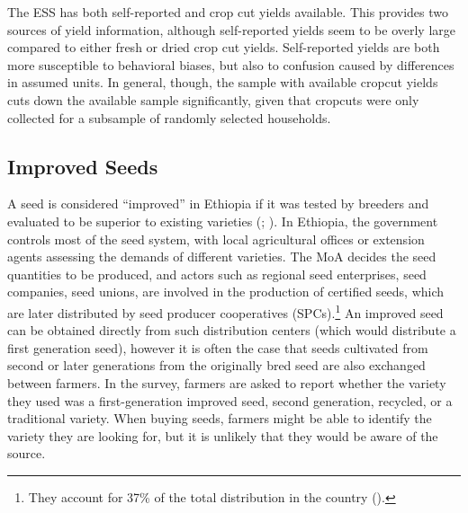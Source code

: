 \documentclass[11pt]{article}
\begin{document}

The ESS has both self-reported and crop cut yields available. This provides two sources of yield information, although self-reported yields seem to be overly large compared to either fresh or dried crop cut yields. Self-reported yields are both more susceptible to behavioral biases, but also to confusion caused by differences in assumed units. In general, though, the sample with available cropcut yields cuts down the available sample significantly, given that cropcuts were only collected for a subsample of randomly selected households.


\subsection{Improved Seeds}

A seed is considered “improved” in Ethiopia if it was tested by breeders and evaluated to be superior to existing varieties  (\citealp{MoA13}; \citealp{kosmowski2020shining}). In Ethiopia, the government controls most of the seed system, with local agricultural offices or extension agents assessing the demands of different varieties. The MoA decides the seed quantities to be produced, and actors such as regional seed enterprises, seed companies, seed unions, are involved in the production of certified seeds, which are later distributed by seed producer cooperatives (SPCs).\footnote{They account for 37\% of the total distribution in the country (\citealp{kosmowski2020shining}).} An improved seed can be obtained directly from such distribution centers (which would distribute a first generation seed), however it is often the case that seeds cultivated from second or later generations from the originally bred seed are also exchanged between farmers. In the survey, farmers are asked to report whether the variety they used was a first-generation improved seed, second generation, recycled, or a traditional variety. When buying seeds, farmers might be able to identify the variety they are looking for, but it is unlikely that they would be aware of the source. 
\end{document}
